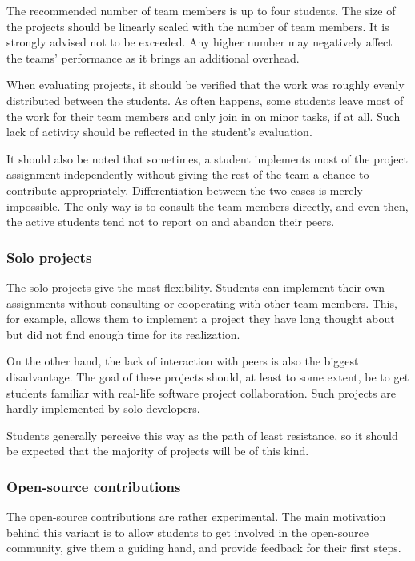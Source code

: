 \documentclass[
  digital,
  color,
  oneside,
  nosansbold,
  nocolorbold,
  lof,
  lot,
]{fithesis4}
\begin{document}
The recommended number of team members is up to four students. The size of the projects should be linearly scaled with the number of team members. It is strongly advised not to be exceeded. Any higher number may negatively affect the teams' performance as it brings an additional overhead.

When evaluating projects, it should be verified that the work was roughly evenly distributed between the students. As often happens, some students leave most of the work for their team members and only join in on minor tasks, if at all. Such lack of activity should be reflected in the student's evaluation.

It should also be noted that sometimes, a student implements most of the project assignment independently without giving the rest of the team a chance to contribute appropriately. Differentiation between the two cases is merely impossible. The only way is to consult the team members directly, and even then, the active students tend not to report on and abandon their peers.

\subsubsection{Solo projects}

The solo projects give the most flexibility. Students can implement their own assignments without consulting or cooperating with other team members. This, for example, allows them to implement a project they have long thought about but did not find enough time for its realization.

On the other hand, the lack of interaction with peers is also the biggest disadvantage. The goal of these projects should, at least to some extent, be to get students familiar with real-life software project collaboration. Such projects are hardly implemented by solo developers.

Students generally perceive this way as the path of least resistance, so it should be expected that the majority of projects will be of this kind.

\subsubsection{Open-source contributions}

The open-source contributions are rather experimental. The main motivation behind this variant is to allow students to get involved in the open-source community, give them a guiding hand, and provide feedback for their first steps. 
\end{document}
